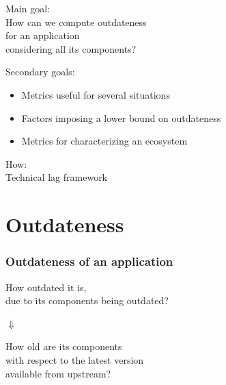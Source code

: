 \documentclass[17pt,aspectratio=169,hyperref={pdfusetitle,colorlinks,allcolors=olive}]{beamer}
\begin{document}
\begin{frame}[fragile]
  
  \begin{center}
    {\Huge Main goal:} \\
    \vspace{1cm}
    \large How can we compute outdateness \\
    for an application \\
    considering all its components? \\
  \end{center}
    
\end{frame}

\begin{frame}[fragile]
  
  \begin{center}
    {\Large Secondary goals:}
    \vspace{.5cm}
    \begin{itemize}
    \item Metrics useful for several situations
    \item Factors imposing a lower bound on outdateness
    \item Metrics for characterizing an ecosystem
    \end{itemize}

    \vspace{1cm}

    {\Large How:}\\
    \vspace{.5cm}
    Technical lag framework \\
   
  \end{center}
    
\end{frame}

\section{Outdateness}

\begin{frame}[fragile]
  \frametitle{Outdateness of an application}

  How outdated it is, \\ due to its components being outdated? \\

  \begin{center}
    {\Large $\Downarrow$}
  \end{center}

  How old are its components \\
  with respect to the latest version \\
  available from upstream? \\
  
\end{frame}
\end{document}

